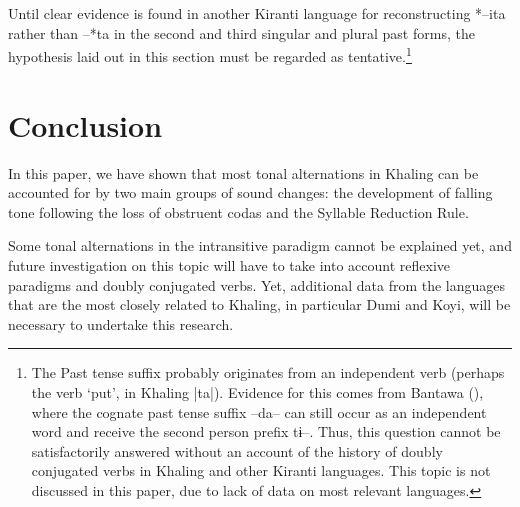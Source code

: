 \documentclass[oldfontcommands,oneside,a4paper,11pt]{article}
\newcommand{\ipa}[1]{{\phon \mbox{#1}}} %
\begin{document}
Until clear evidence is found in another Kiranti language for reconstructing \ipa{*--ita} rather than \ipa{--*ta} in the second and third singular and plural past forms, the hypothesis laid out in this section must be regarded as tentative.\footnote{The Past tense suffix probably originates from an independent verb (perhaps the verb `put', in Khaling |ta|). Evidence for this comes from Bantawa (\citealt[165-72]{doornenbal09}), where the cognate past tense suffix \ipa{--da--} can still occur as an independent word and receive the second person prefix \ipa{tɨ--}. Thus, this question cannot be satisfactorily answered without an account of the history of doubly conjugated verbs in Khaling and other Kiranti languages. This topic is not discussed in this paper, due to lack of data on most relevant languages.
}

\section{Conclusion}

In this paper, we have shown that most tonal alternations in Khaling can be accounted for by two main groups of sound changes: the development of falling tone following the loss of obstruent codas  and the Syllable Reduction Rule.

Some tonal alternations in the intransitive paradigm cannot be explained yet, and future investigation on this topic will have to take into account reflexive paradigms and doubly conjugated verbs. Yet, additional data from the languages that are the most closely related to Khaling, in particular Dumi and Koyi, will be necessary to undertake this research.





\end{document}
